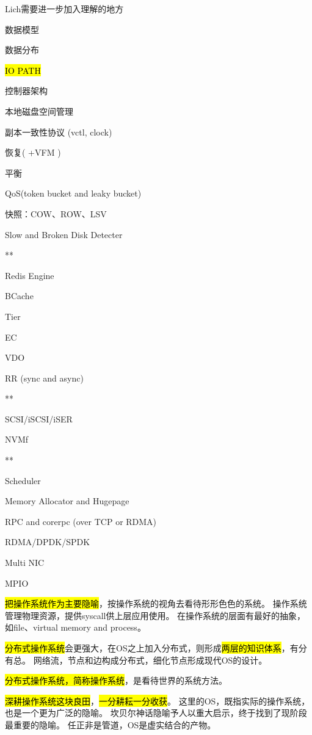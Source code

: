 Lich需要进一步加入理解的地方
\begin{enumbox}
\item 数据模型
\item 数据分布
\item \hl{IO PATH}
\item 控制器架构
\item 本地磁盘空间管理
\item 副本一致性协议 (vctl, clock)
\item 恢复( +VFM )
\item 平衡
\item QoS(token bucket and leaky bucket)
\item 快照：COW、ROW、LSV
\item Slow and Broken Disk Detecter
\item ***
\item Redis Engine
\item BCache
\item Tier
\item EC
\item VDO
\item RR (sync and async)
\item ***
\item SCSI/iSCSI/iSER
\item NVMf
\item ***
\item Scheduler
\item Memory Allocator and Hugepage
\item RPC and corerpc (over TCP or RDMA)
\item RDMA/DPDK/SPDK
\item Multi NIC
\item MPIO
\end{enumbox}

\hrulefill

\hl{把操作系统作为主要隐喻}，按操作系统的视角去看待形形色色的系统。
操作系统管理物理资源，提供syscall供上层应用使用。
在操作系统的层面有最好的抽象，如file、virtual memory and process。

\hl{分布式操作系统}会更强大，在OS之上加入分布式，则形成\hl{两层的知识体系}，有分有总。
网络流，节点和边构成分布式，细化节点形成现代OS的设计。

\hl{分布式操作系统，简称操作系统}，是看待世界的系统方法。

\hl{深耕操作系统这块良田}，\hl{一分耕耘一分收获}。
这里的OS，既指实际的操作系统，也是一个更为广泛的隐喻。
坎贝尔神话隐喻予人以重大启示，终于找到了现阶段最重要的隐喻。
任正非是管道，OS是虚实结合的产物。

